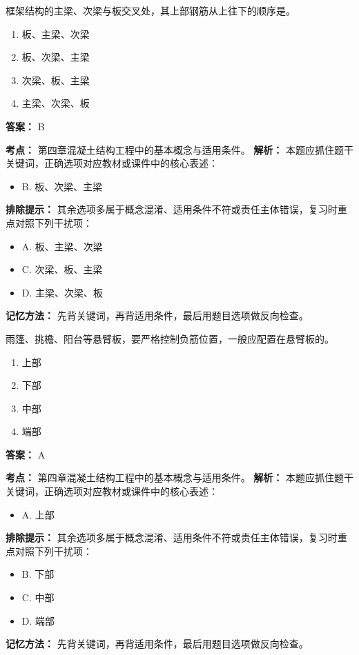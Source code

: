 \documentclass[UTF8,fontset=fandol,11pt]{ctexart}
\begin{document}
\begin{quizbox}[title={第 26 题}]
框架结构的主梁、次梁与板交叉处，其上部钢筋从上往下的顺序是。\\
\begin{enumerate}[label=\Alph*.]
\item 板、主梁、次梁
\item 板、次梁、主梁
\item 次梁、板、主梁
\item 主梁、次梁、板
\end{enumerate}
\textbf{答案：} B
\vspace{0.25em}
\begin{answerbox}[title={考点解析}]
\textbf{考点：} 第四章混凝土结构工程中的基本概念与适用条件。
\textbf{解析：} 本题应抓住题干关键词，正确选项对应教材或课件中的核心表述：
\begin{itemize}
\item B. 板、次梁、主梁
\end{itemize}
\textbf{排除提示：} 其余选项多属于概念混淆、适用条件不符或责任主体错误，复习时重点对照下列干扰项：
\begin{itemize}
\item A. 板、主梁、次梁
\item C. 次梁、板、主梁
\item D. 主梁、次梁、板
\end{itemize}
\textbf{记忆方法：} 先背关键词，再背适用条件，最后用题目选项做反向检查。
\end{answerbox}
\end{quizbox}

\begin{quizbox}[title={第 27 题}]
雨篷、挑檐、阳台等悬臂板，要严格控制负筋位置，一般应配置在悬臂板的。\\
\begin{enumerate}[label=\Alph*.]
\item 上部
\item 下部
\item 中部
\item 端部
\end{enumerate}
\textbf{答案：} A
\vspace{0.25em}
\begin{answerbox}[title={考点解析}]
\textbf{考点：} 第四章混凝土结构工程中的基本概念与适用条件。
\textbf{解析：} 本题应抓住题干关键词，正确选项对应教材或课件中的核心表述：
\begin{itemize}
\item A. 上部
\end{itemize}
\textbf{排除提示：} 其余选项多属于概念混淆、适用条件不符或责任主体错误，复习时重点对照下列干扰项：
\begin{itemize}
\item B. 下部
\item C. 中部
\item D. 端部
\end{itemize}
\textbf{记忆方法：} 先背关键词，再背适用条件，最后用题目选项做反向检查。
\end{answerbox}
\end{quizbox}
\end{document}
